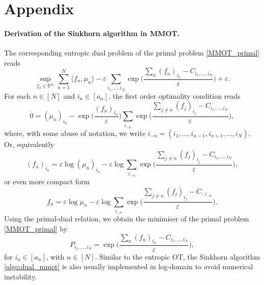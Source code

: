 \documentclass{article}
\begin{document}



\newpage
\appendix

\section{Appendix}

\paragraph{Derivation of the Sinkhorn algorithm in MMOT.} The corresponding entropic dual problem of the primal problem 
\ref{MMOT_primal} reads
\begin{equation*}
  \sup_{f_n \in \mathbb R^{a_n}} \sum_{n=1}^N \langle f_n, \mu_n \rangle - 
  \varepsilon \sum_{i_1,...,i_N} \exp\Big( \frac{\sum_n (f_n)_{i_n} - C_{i_1,...,i_N}}{\varepsilon} \Big) + \varepsilon.
\end{equation*}
For each $n \in [N]$ and $i_n \in [a_n]$, the first order optimality condition reads
\begin{equation*}
  0 = (\mu_n)_{i_n} - \exp\big( \frac{(f_n)_{i_n}}{\varepsilon} \big) 
  \sum_{i_{-n}} \exp\Big( \frac{\sum_{j \neq n} (f_j)_{i_j} - C_{i_1,...,i_N}}{\varepsilon} \Big),
\end{equation*}
where, with some abuse of notation, we write $i_{-n} = (i_1, ..., i_{n-1}, i_{n+1}, ..., i_N)$. Or, equivalently
\begin{equation*}
  (f_n)_{i_n} = \varepsilon \log (\mu_n)_{i_n} - \varepsilon \log \sum_{i_{-n}}
  \exp\Big( \frac{\sum_{j \neq n} (f_j)_{i_j} - C_{i_1,...,i_N}}{\varepsilon} \Big),
\end{equation*}
or even more compact form
\begin{equation*}
  f_n = \varepsilon \log \mu_n - \varepsilon \log \sum_{i_{-n}}
  \exp\Big( \frac{\sum_{j \neq n} (f_j)_{i_j} - C_{\cdot, i_{-n}}}{\varepsilon} \Big).
\end{equation*}
Using the primal-dual relation, we obtain the minimiser of the primal problem \ref{MMOT_primal} by
\begin{equation*}
  P_{i_1,...,i_N} = \exp\Big( \frac{\sum_n (f_n)_{i_n} - C_{i_1,...,i_N}}{\varepsilon} \Big),
\end{equation*}
for $i_n \in [a_n]$, with $n \in [N]$.
Similar to the entropic OT, the Sinkhorn algorithm \ref{algo:dual_mmot} is also usually implemented in log-domain to avoid numerical instability.
\end{document}
